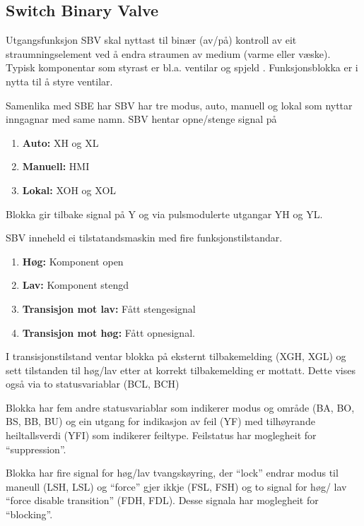 \subsection{Switch Binary Valve}

Utgangsfunksjon \gls{SBV} skal nyttast til binær (av/på) kontroll av eit straumningselement ved å endra straumen av medium (varme eller væske). 
Typisk komponentar som styrast er bl.a. ventilar og spjeld \citep{IEC-63131}.
Funksjonsblokka er i nytta til å styre ventilar.

Samenlika med \gls{SBE} har \gls{SBV} har tre modus, auto, manuell og lokal som nyttar inngagnar med same namn.
\gls{SBV} hentar opne/stenge signal på
\begin{enumerate}
    \item \textbf{Auto:}        XH og XL  
    \item \textbf{Manuell:}     HMI
    \item \textbf{Lokal:}       XOH og XOL
\end{enumerate}
Blokka gir tilbake signal på Y og via pulsmodulerte utgangar YH og YL.

\gls{SBV} inneheld ei tilstatandsmaskin med fire funksjonstilstandar. 
\begin{enumerate}
    \item \textbf{Høg:}                 Komponent open
    \item \textbf{Lav:}                 Komponent stengd
    \item \textbf{Transisjon mot lav:}  Fått stengesignal
    \item \textbf{Transisjon mot høg:}  Fått opnesignal.
\end{enumerate}

I transisjonstilstand ventar blokka på eksternt tilbakemelding (XGH, XGL) 
og sett tilstanden til høg/lav etter at korrekt tilbakemelding er mottatt.
Dette vises også via to statusvariablar (BCL, BCH)

Blokka har fem andre statusvariablar som indikerer modus og område (BA, BO, BS, BB, BU) og
ein utgang for indikasjon av feil (YF) med tilhøyrande heiltallsverdi (YFI) som indikerer feiltype. \newline
Feilstatus har moglegheit for ``suppression''.

Blokka har fire signal for høg/lav tvangskøyring, der ``lock'' endrar modus til maneull (LSH, LSL) og ``force'' gjer ikkje (FSL, FSH)
og to signal for høg/ lav ``force disable transition'' (FDH, FDL).
Desse signala har moglegheit for ``blocking''.

